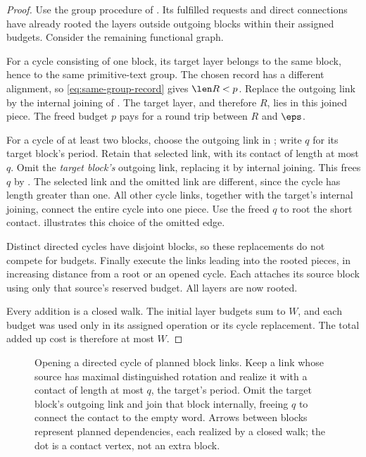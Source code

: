 \begin{proof}
Use the group procedure of . Its fulfilled requests and direct connections have already rooted the layers outside outgoing blocks within their assigned budgets. Consider the remaining functional graph.

For a cycle consisting of one block, its target layer belongs to the same block, hence to the same primitive-text group. The chosen record has a different alignment, so \eqref{eq:same-group-record} gives $\len R<p$. Replace the outgoing link by the internal joining of . The target layer, and therefore $R$, lies in this joined piece. The freed budget $p$ pays for a round trip between $R$ and $\eps$.

For a cycle of at least two blocks, choose the outgoing link in ; write $q$ for its target block's period. Retain that selected link, with its contact of length at most $q$. Omit the \emph{target block's} outgoing link, replacing it by internal joining. This frees $q$ by . The selected link and the omitted link are different, since the cycle has length greater than one. All other cycle links, together with the target's internal joining, connect the entire cycle into one piece. Use the freed $q$ to root the short contact.  illustrates this choice of the omitted edge.

Distinct directed cycles have disjoint blocks, so these replacements do not compete for budgets. Finally execute the links leading into the rooted pieces, in increasing distance from a root or an opened cycle. Each attaches its source block using only that source's reserved budget. All layers are now rooted.

Every addition is a closed walk. The initial layer budgets sum to $W$, and each budget was used only in its assigned operation or its cycle replacement. The total added up cost is therefore at most $W$.
\end{proof}

\begin{figure}[t]
\centering

\caption{Opening a directed cycle of planned block links. Keep a link whose source has maximal distinguished rotation and realize it with a contact of length at most $q$, the target's period. Omit the target block's outgoing link and join that block internally, freeing $q$ to connect the contact to the empty word. Arrows between blocks represent planned dependencies, each realized by a closed walk; the dot is a contact vertex, not an extra block.}
\label{fig:cycles}
\end{figure}

